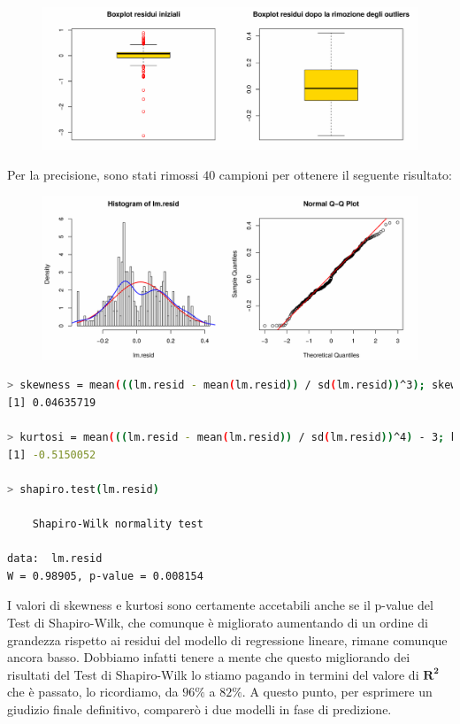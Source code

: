 \documentclass[11pt,a4paper]{article}
\begin{document}
\begin{figure}[H]
	\vspace{-1cm}
	\begin{center}
		\hspace*{-1.5cm}
		\includegraphics[scale=0.7]{imgs/residuals_boxplots_exp.pdf}
	\end{center}
\end{figure}
\vspace{-1cm}\noindent
Per la precisione, sono stati rimossi $40$ campioni per ottenere il seguente
risultato:
\begin{figure}[H]
	\begin{center}
		\hspace*{-1.5cm}
		\includegraphics[scale=0.7]{imgs/residuals_2_exp.pdf}
	\end{center}
\end{figure}
\vspace{-0.9cm}
\begin{lstlisting}[language=bash,basicstyle=\tiny,tabsize=2,frame = single]
> skewness = mean(((lm.resid - mean(lm.resid)) / sd(lm.resid))^3); skewness
[1] 0.04635719

> kurtosi = mean(((lm.resid - mean(lm.resid)) / sd(lm.resid))^4) - 3; kurtosi
[1] -0.5150052

> shapiro.test(lm.resid)

	Shapiro-Wilk normality test

data:  lm.resid
W = 0.98905, p-value = 0.008154
\end{lstlisting}
I valori di skewness e kurtosi sono certamente accetabili anche se il p-value
del Test di Shapiro-Wilk, che comunque \`e migliorato aumentando di un ordine di
grandezza rispetto ai residui del modello di regressione lineare, rimane
comunque ancora basso. Dobbiamo infatti tenere a mente che questo migliorando
dei risultati del Test di Shapiro-Wilk lo stiamo pagando in termini del valore
di $\boldsymbol{R^2}$ che \`e passato, lo ricordiamo, da $96\%$ a $82\%$. A
questo punto, per esprimere un giudizio finale definitivo, comparer\`o i due
modelli in fase di predizione.
\end{document}
